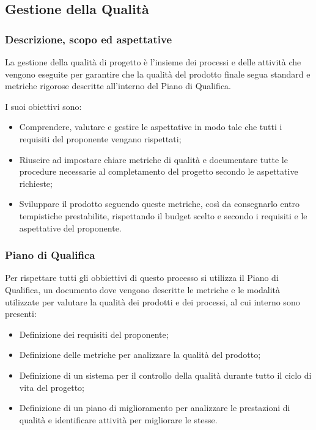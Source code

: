 \pagebreak %
\subsection{Gestione della Qualità}

\subsubsection{Descrizione, scopo ed aspettative}
La gestione della qualità di progetto è l'insieme dei processi e delle attività che vengono eseguite per garantire che la qualità del prodotto finale
segua standard e metriche rigorose descritte all'interno del Piano di Qualifica.

I suoi obiettivi sono:
\begin{itemize}
    \item Comprendere, valutare e gestire le aspettative in modo tale che tutti i requisiti del proponente vengano rispettati;
    \item Riuscire ad impostare chiare metriche di qualità e documentare tutte le procedure necessarie al completamento del progetto secondo le aspettative richieste;
    \item Sviluppare il prodotto seguendo queste metriche, così da consegnarlo entro tempistiche prestabilite, rispettando il budget scelto e secondo i requisiti e le aspettative del proponente.
\end{itemize}
\subsubsection{Piano di Qualifica}

Per rispettare tutti gli obbiettivi di questo processo si utilizza il Piano di Qualifica, un documento dove vengono descritte le metriche e le modalità utilizzate per valutare la qualità dei prodotti e dei processi,
al cui interno sono presenti:

\begin{itemize}
    \item Definizione dei requisiti del proponente; %
    \item Definizione delle metriche per analizzare la qualità del prodotto;
    \item Definizione di un sistema per il controllo della qualità durante tutto il ciclo di vita del progetto;
    \item Definizione di un piano di miglioramento per analizzare le prestazioni di qualità e identificare attività per migliorare le stesse.
\end{itemize}

